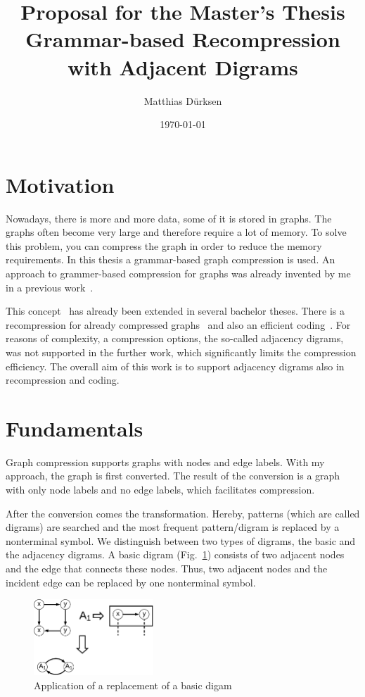 \documentclass[a4paper]{scrartcl}
\title{Proposal for the Master's Thesis\\Grammar-based Recompression with Adjacent Digrams}
\author{Matthias Dürksen}
\date{\today}
\begin{document}
\maketitle

\section{Motivation}\label{sec:motivation}

Nowadays, there is more and more data, some of it is stored in graphs. The graphs often become very large and therefore require a lot of memory. To solve this problem, you can compress the graph in order to reduce the memory requirements. In this thesis a grammar-based graph compression is used. An approach to grammer-based compression for graphs was already invented by me in a previous work~\cite{mattdk}.

This concept~\cite{mattdk} has already been extended in several bachelor theses. There is a recompression for already compressed graphs~\cite{werneke} and also an efficient coding~\cite{georgi}. For reasons of complexity, a compression options, the so-called adjacency digrams, was not supported in the further work, which significantly limits the compression efficiency. 
The overall aim of this work is to support adjacency digrams also in recompression and coding.



\section{Fundamentals}


Graph compression supports graphs with nodes and edge labels. With my approach, the graph is first converted. The result of the conversion is a graph with only node labels and no edge labels, which facilitates compression. 

After the conversion comes the transformation. Hereby, patterns (which are called digrams) are searched and the most frequent pattern/digram is replaced by a nonterminal symbol.
We distinguish between two types of digrams, the basic and the adjacency digrams.
A basic digram (Fig.~\ref{fig:basicDigram}) consists of two adjacent nodes and the edge that connects these nodes. Thus, two adjacent nodes and the incident edge can be replaced by one nonterminal symbol.
\begin{figure}[h]
	\centering
	\includegraphics[width=0.4\textwidth]{img/basicDigram}
	\caption{Application of a replacement of a basic digam}
	\label{fig:basicDigram}
\end{figure}
\end{document}
